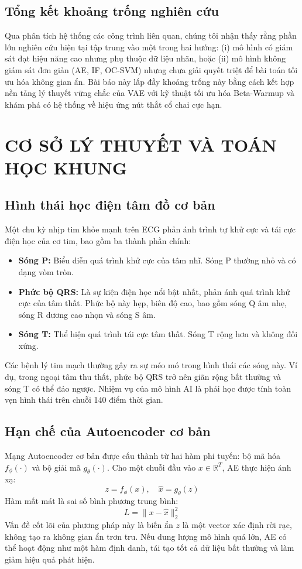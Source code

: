 \documentclass[conference]{IEEEtran}
\begin{document}
\subsection{Tổng kết khoảng trống nghiên cứu}
Qua phân tích hệ thống các công trình liên quan, chúng tôi nhận thấy rằng phần lớn nghiên cứu hiện tại tập trung vào một trong hai hướng: (i) mô hình có giám sát đạt hiệu năng cao nhưng phụ thuộc dữ liệu nhãn, hoặc (ii) mô hình không giám sát đơn giản (AE, IF, OC-SVM) nhưng chưa giải quyết triệt để bài toán tối ưu hóa không gian ẩn. Bài báo này lấp đầy khoảng trống này bằng cách kết hợp nền tảng lý thuyết vững chắc của VAE với kỹ thuật tối ưu hóa Beta-Warmup và khám phá có hệ thống về hiệu ứng nút thắt cổ chai cực hạn.

\section{CƠ SỞ LÝ THUYẾT VÀ TOÁN HỌC KHUNG}
\subsection{Hình thái học điện tâm đồ cơ bản}
Một chu kỳ nhịp tim khỏe mạnh trên ECG phản ánh trình tự khử cực và tái cực điện học của cơ tim, bao gồm ba thành phần chính:
\begin{itemize}
\item \textbf{Sóng P:} Biểu diễn quá trình khử cực của tâm nhĩ. Sóng P thường nhỏ và có dạng vòm tròn.
\item \textbf{Phức bộ QRS:} Là sự kiện điện học nổi bật nhất, phản ánh quá trình khử cực của tâm thất. Phức bộ này hẹp, biên độ cao, bao gồm sóng Q âm nhẹ, sóng R dương cao nhọn và sóng S âm.
\item \textbf{Sóng T:} Thể hiện quá trình tái cực tâm thất. Sóng T rộng hơn và không đối xứng.
\end{itemize}
Các bệnh lý tim mạch thường gây ra sự méo mó trong hình thái các sóng này. Ví dụ, trong ngoại tâm thu thất, phức bộ QRS trở nên giãn rộng bất thường và sóng T có thể đảo ngược. Nhiệm vụ của mô hình AI là phải học được tính toàn vẹn hình thái trên chuỗi 140 điểm thời gian.

\subsection{Hạn chế của Autoencoder cơ bản}
Mạng Autoencoder cơ bản được cấu thành từ hai hàm phi tuyến: bộ mã hóa \(f_\phi(\cdot)\) và bộ giải mã \(g_\theta(\cdot)\). Cho một chuỗi đầu vào \(x \in \mathbb{R}^T\), AE thực hiện ánh xạ:
\begin{equation}
z = f_\phi(x), \quad \hat{x} = g_\theta(z)
\end{equation}
Hàm mất mát là sai số bình phương trung bình:
\begin{equation}
L = \|x - \hat{x}\|_2^2
\end{equation}
Vấn đề cốt lõi của phương pháp này là biến ẩn \(z\) là một vector xác định rời rạc, không tạo ra không gian ẩn trơn tru. Nếu dung lượng mô hình quá lớn, AE có thể hoạt động như một hàm định danh, tái tạo tốt cả dữ liệu bất thường và làm giảm hiệu quả phát hiện.
\end{document}
